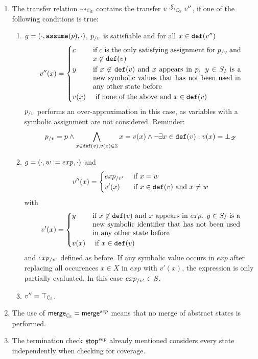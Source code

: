 \begin{enumerate}[leftmargin=*, label=\arabic*.]
\item The transfer relation $\rightsquigarrow_{\mathbb{C_{S}}}$ contains the transfer $v \overset{g}{\rightsquigarrow}_{\mathbb{C_{S}}} v''$, if one of the following conditions is true:
	\begin{enumerate}[label = \alph*)]
		\item $g = (\cdot, \texttt{assume}(p), \cdot)$, $p_{/v}$ is satisfiable and for all $x \in \texttt{def}(v'')$
			\[ v''(x) = \begin{dcases}
				c & \parbox[t]{.6\textwidth}{ if $c$ is the only satisfying assignment for $p_\using{v}$ and $x \not\in \defRange(v)$}\\
				y & \parbox[t]{.6\textwidth}{ if $x \not\in \defRange(v)$ and $x$  appears in $p$. $y \in \symIds$ is a new symbolic values that has not been used in any other state before}\\
				v(x) & \text{ if none of the above and } x \in \defRange(v)
			\end{dcases}\]
			$p_{/v}$ performs an over-approximation in this case, as variables with a symbolic assignment are not considered.
			Reminder: \[p_{/v} = p \wedge \bigwedge\limits_{x \in \texttt{def}(v), v(x) \in \mathbb{Z}}  x = v(x) \wedge \neg \exists x \in \texttt{def}(v) : v(x) = \bot_{\mathscr{Z}}\]

		\item $g = (\cdot, w := exp, \cdot)$ and
			\[ v''(x) = \begin{dcases}
				exp_{/v'} & \text{ if } x = w\\
				v'(x) & \text{ if } x \in \texttt{def}(v) \text{ and } x \neq w
			\end{dcases}\]
			with
			\[v'(x) = \begin{dcases}
				y & \parbox[t]{.6\textwidth}{if $x \not \in \defRange(v)$ and $x$ appears in $exp$. $y \in \symIds$ is a new symbolic identifier that has not been used in any other state before}\\
				v(x) & \text{ if } x \in \defRange(v)
			\end{dcases}\]
			and $exp_{/v'}$ defined as before. If any symbolic value occurs in $exp$ after replacing all occurences $x \in X$ in $exp$ with $v'(x)$,
			the expression is only partially evaluated. In this case $exp_{/v'} \in S$.
		\item $v'' = \top_{\mathbb{C_{S}}}$.
	\end{enumerate}

\item The use of $\operatorname{\operatorname{\mathsf{merge}}}_{\mathbb{C_{S}}} = \operatorname{\operatorname{\mathsf{merge}}}^{sep}$ means that no merge of abstract states is performed.
\item The termination check $\operatorname{\operatorname{\mathsf{stop}}}^{sep}$ already mentioned considers every state independently when checking for coverage.


\end{enumerate}
